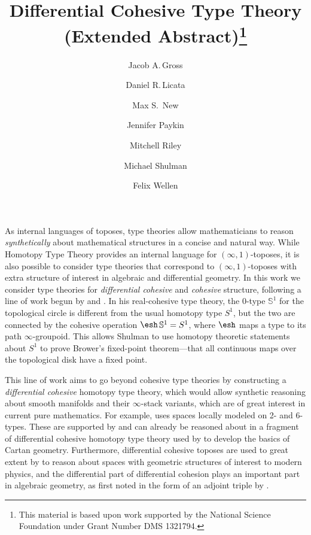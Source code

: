 \documentclass{article}
\title{Differential Cohesive Type Theory (Extended Abstract)\thanks{This
    material is based upon work supported by the National Science Foundation
    under Grant Number DMS 1321794.}}
\author[$\Red$]{Jacob A.\,Gross}
\affil[$\Red$]{University of Pittsburgh}
\author[$\sharp$]{Daniel R.\,Licata}
\affil[$\sharp$]{Wesleyan University}
\author[$\Wat$]{Max S.\, New}
\affil[$\Wat$]{Northeastern University}
\author[$\flat$]{Jennifer Paykin}
\affil[$\flat$]{University of Pennsylvania}
\author[$\sharp$]{Mitchell Riley}
\author[$\shape$]{Michael Shulman}
\affil[$\shape$]{University of San Diego}
\author[$\Cored$]{Felix Wellen}
\affil[$\Cored$]{Karlsruhe Institute of Technology}
\date{}
\begin{document}
\maketitle



As internal languages of toposes, type theories allow mathematicians to
reason \emph{synthetically} about mathematical structures in a concise and
natural way. While Homotopy Type Theory provides an internal language for
$(\infty,1)$-toposes, it is also possible to consider type theories that
correspond to $(\infty,1)$-toposes with extra structure of interest in algebraic
and differential geometry. In this work we consider type theories for
\emph{differential cohesive} and \emph{cohesive} structure, following a line of
work begun by \citet{Shulman2015} and \citet{Licata2016}.
In his real-cohesive type theory, the 0-type $\mathbb S^1$ for the topological
circle is different from the usual homotopy type $S^1$, but the two are
connected by the cohesive operation $\shape\,\mathbb S^1=S^1$, where $\shape$
maps a type to its path $\infty$-groupoid. This allows Shulman to use homotopy
theoretic statements about $S^1$ to prove Brower's fixed-point theorem---that
all continuous maps over the topological disk have a fixed point.


This line of work aims to go beyond cohesive type theories by constructing a
\emph{differential cohesive} homotopy type theory, which would allow synthetic
reasoning about smooth manifolds and their $\infty$-stack variants, which are of
great interest in current pure mathematics. For example,
\citet{SatiSchreiberStasheff2012} uses spaces locally modeled on 2- and 6-types.
These are supported by and can already be reasoned about in a fragment of
differential cohesive homotopy type theory used by \cite{Wellen2017} to develop
the basics of Cartan geometry. Furthermore, differential cohesive toposes are
used to great extent by \citet{Schreiber2013} to reason about spaces with
geometric structures of interest to modern physics, and the differential part of
differential cohesion plays an important part in algebraic geometry, as first
noted in the form of an adjoint triple by \citet{SimpsonTeleman}.
\end{document}

